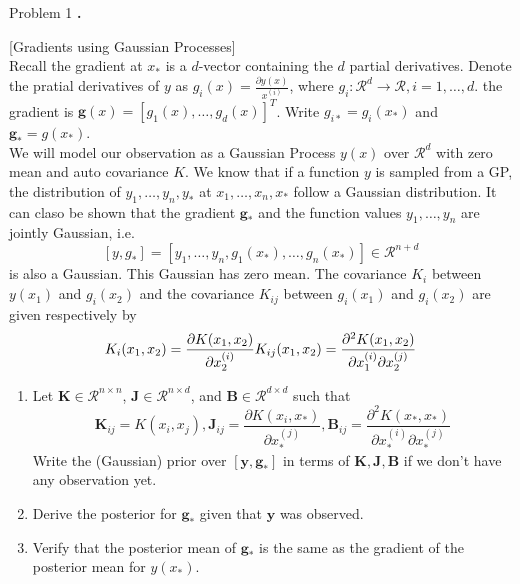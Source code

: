 \documentclass{article}
\newcounter{pcounter}                                   %
\newenvironment{problem}                                %
{                                                       %
    \color{gray}                                        %
    \stepcounter{pcounter}                              %
    \textbf{\arabic{pcounter}.}                         %
}{}                                                     %
\newcommand{\domR}{\mathcal{R}}                         %
\begin{document}
\begin{section}{Problem 1}
        \begin{problem}
            [Gradients using Gaussian Processes] \\
            Recall the gradient at $x_*$ is a $d$-vector containing the $d$ partial derivatives. Denote the pratial derivatives of $y$ as $g_i(x) = \frac{\partial y(x)}{x^{(i)}}$, where $g_i : \domR^{d} \to \domR, i=1, \dots, d$. the gradient is $\mathbf{g}(x) = [g_1(x), \dots, g_d(x)]^T$. Write $g_{i*} = g_i(x_*)$ and $\mathbf{g}_* = g(x_*)$. \\
            We will model our observation as a Gaussian Process $y(x)$ over $\domR^d$ with zero mean and auto covariance $K$. We know that if a function $y$ is sampled from a GP, the distribution of $y_1, \dots, y_n, y_*$ at $x_1, \dots, x_n, x_*$ follow a Gaussian distribution. It can claso be shown that the gradient $\mathbf{g}_*$ and the function values $y_1, \dots, y_n$ are jointly Gaussian, i.e.
            $$
                [y, g_*] = [y_1, \dots, y_n, g_1(x_*), \dots, g_n(x_*)] \in \domR^{n+d}
            $$
            is also a Gaussian. This Gaussian has zero mean. The covariance $K_i$ between $y(x_1)$ and $g_i(x_2)$ and the covariance $K_{ij}$ between $g_i(x_1)$ and $g_i(x_2)$ are given respectively by
            $$
                K_i(x_1, x_2) = \frac{\partial K(x_1, x_2)}{\partial x_2^{(i)}}
                \\
                K_{ij} (x_1, x_2) = \frac{\partial^2 K(x_1, x_2)}
                                        {\partial{x_1^{(i)}} \partial{x_2^{(j)}}}
            $$
            \begin{enumerate}[label=\alph*)]
                \item Let $\mathbf{K} \in \domR^{n \times n}$, $\mathbf{J} \in \domR^{n \times d}$, and $\mathbf{B} \in \domR^{d \times d}$ such that
                $$
                    \mathbf{K}_{ij} = K(x_i, x_j),
                    \mathbf{J}_{ij} = \frac{\partial K(x_i, x_*)}{\partial x_*^{(j)}},
                    \mathbf{B}_{ij} = \frac{\partial^2 K(x_*, x_*)}{\partial x_*^{(i)} \partial x_*^{(j)}}
                $$
                Write the (Gaussian) prior over $[\mathbf{y}, \mathbf{g}_*]$ in terms of $\mathbf{K, J, B}$ if we don't have any observation yet.

                \item Derive the posterior for $\mathbf{g_*}$ given that $\mathbf{y}$ was observed.
                
                \item Verify that the posterior mean of $\mathbf{g_*}$ is the same as the gradient of the posterior mean for $y(x_*)$.
            \end{enumerate}
        \end{problem}


\end{section}
\end{document}
